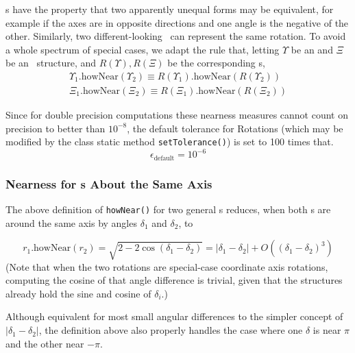 \Ax s have the property that two apparently unequal forms may be equivalent,
for example if the axes are in opposite directions and one angle is the
negative of the other.  
Similarly, two different-looking \Es\ can represent the same
rotation.  To avoid a whole spectrum of special cases, we adapt the rule that,
letting $\Upsilon$ be an \Ax and $\Xi$ be an \Es\ structure, and
$R(\Upsilon), R(\Xi)$ be the corresponding \Ro s,
\begin{eqnarray}
  \Upsilon_1 \mbox{.howNear} (\Upsilon_2) \equiv
	R \left( \Upsilon_1 \right) \mbox{.howNear}
	\left( R \left( \Upsilon_2 \right) \right)
	\\
  \Xi_1 \mbox{.howNear} (\Xi_2) \equiv
	R \left( \Xi_1 \right) \mbox{.howNear}
	\left( R \left( \Xi_2 \right) \right)
\end{eqnarray}

Since for double precision computations these nearness measures cannot 
count on precision to better than $10^{-8}$, 
the default tolerance for Rotations 
(which may be modified by the class static method {\tt setTolerance()}) 
is set to 100 times that.
\begin{equation}
  \epsilon_{\mbox{default}} =  10^{-6}
\label{eq:epsildefR}
\end{equation}

\subsubsection{Nearness for \protect\Ro s About the Same Axis}
\label{rotsame}

The above definition of {\tt howNear()} for two general \Rotation s reduces,
when both \Rotation s are around the same axis by angles $\delta_1$ and
$\delta_2$, to

\begin{equation}
 r_1 \mbox{.howNear} (r_2) = \sqrt{ 2 - 2 \cos (\delta_1 - \delta_2) }
 = | \delta_1 - \delta_2 | + O \left( (\delta_1 - \delta_2)^3 \right)
\end{equation}
\noindent
(Note that when the two rotations are special-case coordinate axis rotations,
computing the cosine of that angle difference is trivial, given
that the structures already hold the sine and cosine of $\delta_i$.)

Although equivalent for most small angular differences to the simpler concept
of $ | \delta_1 - \delta_2 | $, the definition above also properly handles the
case where one $\delta$ is near $\pi$ and the other near $-\pi$.

